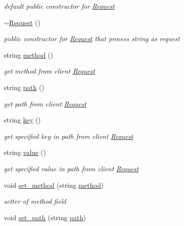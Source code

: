 \begin{DoxyCompactItemize}
\begin{DoxyCompactList}\small\item\em default public constructor for \hyperlink{classRequest}{Request} \end{DoxyCompactList}\item 
\hyperlink{classRequest_a4d57c725686701f773eb3630630a7ea2}{$\sim$\+Request} ()
\begin{DoxyCompactList}\small\item\em public constructor for \hyperlink{classRequest}{Request} that process string as request \end{DoxyCompactList}\item 
string \hyperlink{classRequest_a8cc222c2c9b1f27b0805401a9c657789}{method} ()
\begin{DoxyCompactList}\small\item\em get method from client \hyperlink{classRequest}{Request} \end{DoxyCompactList}\item 
string \hyperlink{classRequest_ac2b4080268fb8f61e74d96f30f1b1b95}{path} ()
\begin{DoxyCompactList}\small\item\em get path from client \hyperlink{classRequest}{Request} \end{DoxyCompactList}\item 
string \hyperlink{classRequest_a0065bb0a4c9fe961cb7f9386e15d0fed}{key} ()
\begin{DoxyCompactList}\small\item\em get specified key in path from client \hyperlink{classRequest}{Request} \end{DoxyCompactList}\item 
string \hyperlink{classRequest_a5d98408923e7921454b321b2c6e64471}{value} ()
\begin{DoxyCompactList}\small\item\em get specified value in path from client \hyperlink{classRequest}{Request} \end{DoxyCompactList}\item 
void \hyperlink{classRequest_a4cc6a4dbe5e4f7b450f6969fd7b49b3d}{set\+\_\+method} (string \hyperlink{classRequest_a8cc222c2c9b1f27b0805401a9c657789}{method})\hypertarget{classRequest_a4cc6a4dbe5e4f7b450f6969fd7b49b3d}{}\label{classRequest_a4cc6a4dbe5e4f7b450f6969fd7b49b3d}

\begin{DoxyCompactList}\small\item\em setter of method field \end{DoxyCompactList}\item 
void \hyperlink{classRequest_a459b2074c4df98ce1affb958447a7e1e}{set\+\_\+path} (string \hyperlink{classRequest_ac2b4080268fb8f61e74d96f30f1b1b95}{path})\hypertarget{classRequest_a459b2074c4df98ce1affb958447a7e1e}{}\label{classRequest_a459b2074c4df98ce1affb958447a7e1e}


\end{DoxyCompactItemize}
